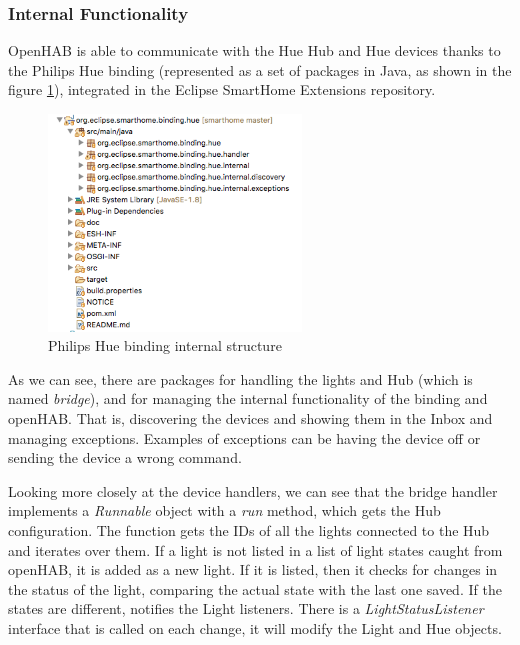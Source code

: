 \subsubsection{Internal Functionality}
OpenHAB is able to communicate with the Hue Hub and Hue devices thanks to the Philips Hue binding (represented as a set of packages
in Java, as shown in the figure \ref{fig:hue-binding-structure}), integrated in the Eclipse SmartHome Extensions repository.

\begin{figure}
    \centering
    \includegraphics[width=0.6\textwidth]{images/Chapter_07/hue-binding-structure.png}
    \caption{Philips Hue binding internal structure}
    \label{fig:hue-binding-structure}
\end{figure}

As we can see, there are packages for handling the lights and Hub (which is named \textit{bridge}), and for managing the internal
functionality of the binding and openHAB. That is, discovering the devices and showing them in the Inbox and managing exceptions.
Examples of exceptions can be having the device off or sending the device a wrong command.

Looking more closely at the device handlers, we can see that the bridge handler implements a \textit{Runnable} object with a
\textit{run} method, which gets the Hub configuration. The function gets the IDs of all the lights connected to the Hub and iterates
over them. If a light is not listed in a list of light states caught from openHAB, it is added as a new light. If it is listed, then
it checks for changes in the status of the light, comparing the actual state with the last one saved. If the states are different,
notifies the Light listeners. There is a \textit{LightStatusListener} interface that is called on each change, it will modify the
Light and Hue objects.

